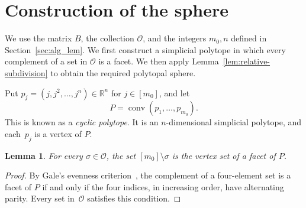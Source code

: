 \documentclass[10pt,a4paper]{amsart}
\theoremstyle{plain}
\newtheorem{lemma}[theorem]{Lemma}
\numberwithin{equation}{section}
\theoremstyle{remark}
\theoremstyle{definition}
\newcommand{\cO}{\mathcal O}
\DeclareMathOperator{\conv}{conv}
\newcommand{\R}{\mathbb R}
\begin{document}
\section{Construction of the sphere}\label{sec:construction}

We use the matrix $B$, the collection $\cO$, and the integers $m_0,n$ defined in Section~\ref{sec:alg_lem}.
We first construct a simplicial polytope in which every complement of a set in $\cO$ is a facet.
We then apply Lemma~\ref{lem:relative-subdivision} to obtain the required polytopal sphere.

Put $p_j=(j,j^2,\ldots,j^n)\in\R^n$ for $j \in [m_0]$, and let
$$
    P=\conv(p_1,\ldots,p_{m_0}).
$$
This is known as a \emph{cyclic polytope}.
It is an $n$-dimensional simplicial polytope, and each~$p_j$ is a vertex of $P$.
\begin{lemma}\label{lem:cyclic-facets}
    For every $\sigma \in \cO$, the set $[m_0]\setminus\sigma$ is the vertex set of a facet of $P$.
\end{lemma}
\begin{proof}
    By Gale's evenness criterion~\cite{Ziegler1995book}, the complement of a four-element set is a facet of $P$ if and only if the four indices, in increasing order, have alternating parity.
    Every set in~$\cO$ satisfies this condition.
\end{proof}
\end{document}

